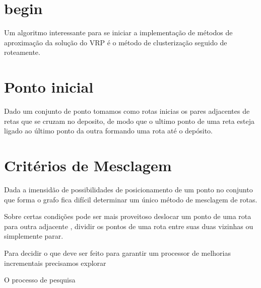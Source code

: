 \documentclass[a4paper,12pt]{article}
\begin{document}
\section{begin}

 Um algoritmo interessante para se iniciar a implementação de métodos de aproximação da solução do
VRP é o método de clusterização seguido de roteamente.

\section{Ponto inicial}

 Dado um conjunto de ponto tomamos como rotas inicias os pares adjacentes de retas que se cruzam no
deposito, de modo que o ultimo ponto de uma reta esteja ligado ao último ponto da outra formando uma
rota até o depósito. 

\section{Critérios de Mesclagem}

 Dada a imensidão de possibilidades de posicionamento de um ponto no conjunto que forma o grafo fica
difícil determinar um único método de mesclagem de rotas.

 Sobre certas condições pode ser mais proveitoso deslocar um ponto de uma rota para outra adjacente
, dividir os pontos de uma rota entre suas duas vizinhas ou simplemente parar.

 Para decidir o que deve ser feito para garantir um processor de melhorias incrementais precisamos
explorar 

 O processo de pesquisa 
\end{document}
